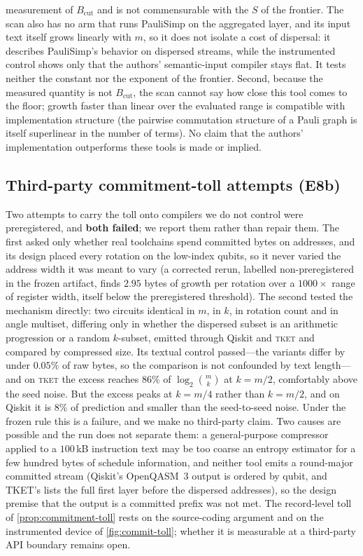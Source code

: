 measurement of $B_{\mathrm{cut}}$ and is not commensurable with the $S$
of the frontier.  The scan also has no arm that runs PauliSimp on the
aggregated layer, and its input text itself grows linearly with $m$, so
it does not isolate a cost of dispersal: it describes PauliSimp's
behavior on dispersed streams, while the instrumented control shows only
that the authors' semantic-input compiler stays flat.  It tests neither
the constant nor the exponent of the frontier.  Second, because the measured quantity is not $B_{\mathrm{cut}}$, the scan
cannot say how close this tool comes to the floor; growth faster than
linear over the evaluated range is compatible with implementation
structure (the pairwise commutation structure of a Pauli graph is itself
superlinear in the number of terms).  No claim that
the authors' implementation outperforms these tools is made or implied.

\subsection{Third-party commitment-toll attempts (E8b)}
Two attempts to carry the toll onto compilers we do not control were
preregistered, and \textbf{both failed}; we report them rather than
repair them.  The first asked only whether real toolchains spend
committed bytes on addresses, and its design placed every rotation on
the low-index qubits, so it never varied the address width it was meant
to vary (a corrected rerun, labelled non-preregistered in the frozen
artifact, finds $2.95$ bytes of growth per rotation over a $1000\times$
range of register width, itself below the preregistered threshold).
The second tested the mechanism directly: two circuits identical in $m$,
in $k$, in rotation count and in angle multiset, differing only in
whether the dispersed subset is an arithmetic progression or a random
$k$-subset, emitted through Qiskit and \textsc{tket} and compared by
compressed size.  Its textual control passed---the variants differ by
under $0.05\%$ of raw bytes, so the comparison is not confounded by text
length---and on \textsc{tket} the excess reaches $86\%$ of
$\log_2\binom{m}{k}$ at $k=m/2$, comfortably above the seed noise.  But
the excess peaks at $k=m/4$ rather than $k=m/2$, and on Qiskit it is
$8\%$ of prediction and smaller than the seed-to-seed noise.  Under the
frozen rule this is a failure, and we make no third-party claim.  Two
causes are possible and the run does not separate them: a general-purpose
compressor applied to a $100$\,kB instruction text may be too coarse an
entropy estimator for a few hundred bytes of schedule information, and
neither tool emits a round-major committed stream (Qiskit's OpenQASM~3
output is ordered by qubit, and TKET's lists the full first layer before
the dispersed addresses), so the design premise that the output is a
committed prefix was not met.  The record-level toll of
\cref{prop:commitment-toll} rests on the source-coding argument and on the
instrumented device of \cref{fig:commit-toll}; whether it is measurable
at a third-party API boundary remains open.

